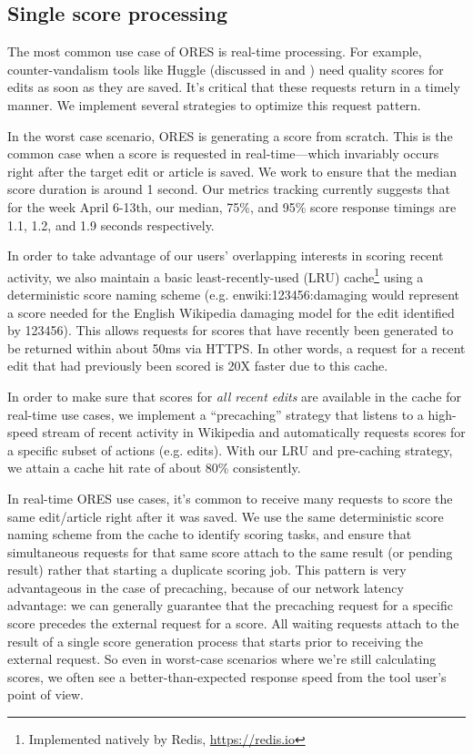 \subsection{Single score processing}
The most common use case of ORES is real-time processing.  For example, counter-vandalism tools like Huggle (discussed in \cite{halfaker14snuggle} and \cite{halfaker13rise}) need quality scores for edits as soon as they are saved.  It's critical that these requests return in a timely manner.  We implement several strategies to optimize this request pattern.

In the worst case scenario, ORES is generating a score from scratch.  This is the common case when a score is requested in real-time---which invariably occurs right after the target edit or article is saved.  We work to ensure that the median score duration is around 1 second.  Our metrics tracking currently suggests that for the week April 6-13th, our median, 75\%, and 95\% score response timings are 1.1, 1.2, and 1.9 seconds respectively.

In order to take advantage of our users' overlapping interests in scoring recent activity, we also maintain a basic least-recently-used (LRU) cache\footnote{Implemented natively by Redis, \url{https://redis.io}} using a deterministic score naming scheme (e.g. enwiki:123456:damaging would represent a score needed for the English Wikipedia damaging model for the edit identified by 123456).  This allows requests for scores that have recently been generated to be returned within about 50ms via HTTPS.  In other words, a request for a recent edit that had previously been scored is 20X faster due to this cache.

In order to make sure that scores for \emph{all recent edits} are available in the cache for real-time use cases, we implement a ``precaching'' strategy that listens to a high-speed stream of recent activity in Wikipedia and automatically requests scores for a specific subset of actions (e.g. edits).  With our LRU and pre-caching strategy, we attain a cache hit rate of about 80\% consistently.

In real-time ORES use cases, it's common to receive many requests to score the same edit/article right after it was saved.  We use the same deterministic score naming scheme from the cache to identify scoring tasks, and ensure that simultaneous requests for that same score attach to the same result (or pending result) rather that starting a duplicate scoring job.  This pattern is very advantageous in the case of precaching, because of our network latency advantage: we can generally guarantee that the precaching request for a specific score precedes the external request for a score.  All waiting requests attach to the result of a single score generation process that starts prior to receiving the external request.  So even in worst-case scenarios where we're still calculating scores, we often see a better-than-expected response speed from the tool user's point of view.

